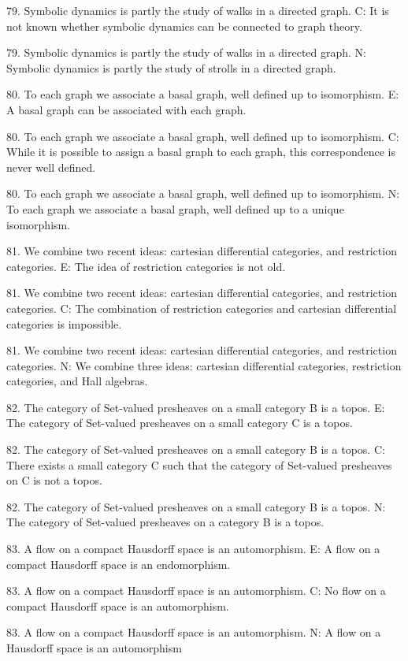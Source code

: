 79. Symbolic dynamics is partly the study of walks in a directed graph.
C: It is not known whether symbolic dynamics can be connected to graph theory.

79. Symbolic dynamics is partly the study of walks in a directed graph.
N: Symbolic dynamics is partly the study of strolls in a directed graph.

80. To each graph we associate a basal graph, well defined up to isomorphism.
E: A basal graph can be associated with each graph.

80. To each graph we associate a basal graph, well defined up to isomorphism.
C: While it is possible to assign a basal graph to each graph, this correspondence is never well defined.

80. To each graph we associate a basal graph, well defined up to isomorphism.
N: To each graph we associate a basal graph, well defined up to a unique isomorphism.

81. We combine two recent ideas: cartesian differential categories, and restriction categories.
E: The idea of restriction categories is not old.

81. We combine two recent ideas: cartesian differential categories, and restriction categories.
C: The combination of restriction categories and cartesian differential categories is impossible.

81. We combine two recent ideas: cartesian differential categories, and restriction categories.
N: We combine three ideas: cartesian differential categories, restriction categories, and Hall algebras.

82. The category of Set-valued presheaves on a small category B is a topos.
E: The category of Set-valued presheaves on a small category C is a topos.

82. The category of Set-valued presheaves on a small category B is a topos.
C: There exists a small category C such that the category of Set-valued presheaves on C is not a topos.

82. The category of Set-valued presheaves on a small category B is a topos.
N: The category of Set-valued presheaves on a category B is a topos.

83. A flow on a compact Hausdorff space is an automorphism.
E: A flow on a compact Hausdorff space is an endomorphism.

83. A flow on a compact Hausdorff space is an automorphism.
C: No flow on a compact Hausdorff space is an automorphism.

83. A flow on a compact Hausdorff space is an automorphism.
N: A flow on a Hausdorff space is an automorphism

